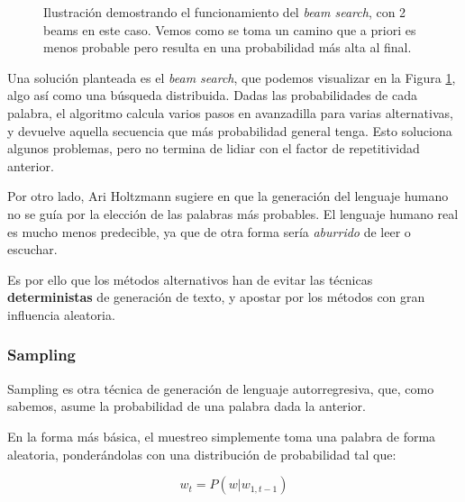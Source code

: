 \begin{figure}[h!]

	\caption{Ilustración demostrando el funcionamiento del \textit{beam search}, con 2 beams en este caso. Vemos como se toma un camino que a priori es menos probable pero resulta en una probabilidad más alta al final.}
	\label{tkz:beams}
\end{figure}


Una solución planteada es el \textit{beam search}, que podemos visualizar en la Figura \ref{tkz:beams}, algo así como una búsqueda distribuida. Dadas las probabilidades de cada palabra, el algoritmo calcula varios pasos en avanzadilla para varias alternativas, y devuelve aquella secuencia que más probabilidad general tenga. Esto soluciona algunos problemas, pero no termina de lidiar con el factor de repetitividad anterior. 

Por otro lado, Ari Holtzmann sugiere en \cite{holtzman2020curious} que la generación del lenguaje humano no se guía por la elección de las palabras más probables. El lenguaje humano real es mucho menos predecible, ya que de otra forma sería \textit{aburrido} de leer o escuchar.

Es por ello que los métodos alternativos han de evitar las técnicas \textbf{deterministas} de generación de texto, y apostar por los métodos con gran influencia aleatoria.

\subsubsection{Sampling}

Sampling es otra técnica de generación de lenguaje autorregresiva, que, como sabemos, asume la probabilidad de una palabra dada la anterior.

En la forma más básica, el muestreo simplemente toma una palabra de forma aleatoria, ponderándolas con una distribución de probabilidad tal que:

\begin{equation}
	w_t = P(w | w_{1, t-1})
\end{equation}

